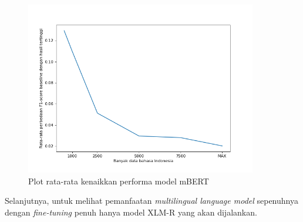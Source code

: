         \begin{figure}[ht]
            \centering
            \includegraphics[width=0.9\textwidth]{resources/plot-gain-mbert.png}
            \caption{Plot rata-rata kenaikkan performa model mBERT}
            \label{fig:plot_gain}
        \end{figure}
        
        Selanjutnya, untuk melihat pemanfaatan \textit{multilingual language model} sepenuhnya dengan \textit{fine-tuning} penuh hanya model XLM-R yang akan dijalankan.

    \vspace{15mm}
